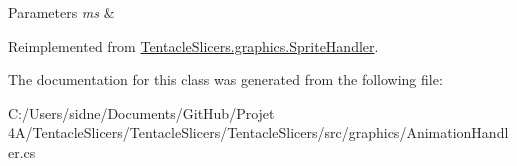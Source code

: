 \begin{DoxyParams}{Parameters}
{\em ms} & \\
\hline
\end{DoxyParams}


Reimplemented from \hyperlink{class_tentacle_slicers_1_1graphics_1_1_sprite_handler_ab08b58ee3a955cbb5621d8aa4e32c97b}{Tentacle\+Slicers.\+graphics.\+Sprite\+Handler}.



The documentation for this class was generated from the following file\+:\begin{DoxyCompactItemize}
\item 
C\+:/\+Users/sidne/\+Documents/\+Git\+Hub/\+Projet 4\+A/\+Tentacle\+Slicers/\+Tentacle\+Slicers/\+Tentacle\+Slicers/src/graphics/Animation\+Handler.\+cs\end{DoxyCompactItemize}
